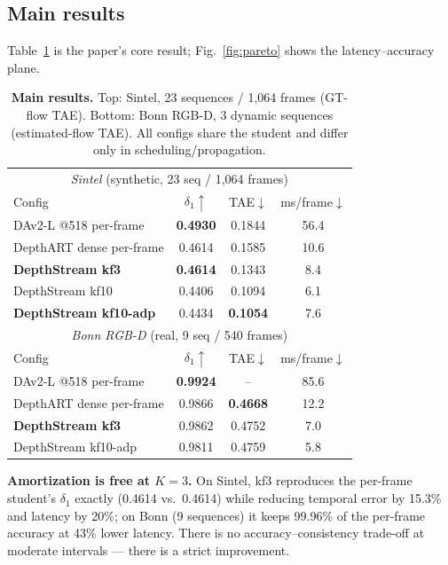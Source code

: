 \documentclass[10pt,twocolumn]{article}
\begin{document}
\subsection{Main results}
Table~\ref{tab:main} is the paper's core result; Fig.~\ref{fig:pareto} shows
the latency--accuracy plane.

\begin{table}[t]
\centering\small
\setlength{\tabcolsep}{3.4pt}
\caption{\textbf{Main results.} Top: Sintel, 23 sequences / 1{,}064 frames
(GT-flow TAE). Bottom: Bonn RGB-D, 3 dynamic sequences (estimated-flow TAE).
All configs share the student and differ only in scheduling/propagation.}
\label{tab:main}
\begin{tabular}{lccc}
\toprule
\multicolumn{4}{c}{\emph{Sintel} (synthetic, 23 seq / 1{,}064 frames)}\\
Config & $\delta_1{\uparrow}$ & TAE$\downarrow$ & ms/frame$\downarrow$\\
\midrule
DAv2-L @518 per-frame & \textbf{0.4930} & 0.1844 & 56.4\\
DepthART dense per-frame & 0.4614 & 0.1585 & 10.6\\
\textbf{DepthStream kf3} & \textbf{0.4614} & 0.1343 & 8.4\\
DepthStream kf10 & 0.4406 & 0.1094 & 6.1\\
\textbf{DepthStream kf10-adp} & 0.4434 & \textbf{0.1054} & 7.6\\
\midrule
\multicolumn{4}{c}{\emph{Bonn RGB-D} (real, 9 seq / 540 frames)}\\
Config & $\delta_1{\uparrow}$ & TAE$\downarrow$ & ms/frame$\downarrow$\\
\midrule
DAv2-L @518 per-frame & \textbf{0.9924} & -- & 85.6\\
DepthART dense per-frame & 0.9866 & \textbf{0.4668} & 12.2\\
\textbf{DepthStream kf3} & 0.9862 & 0.4752 & 7.0\\
DepthStream kf10-adp & 0.9811 & 0.4759 & 5.8\\
\bottomrule
\end{tabular}
\end{table}

\textbf{Amortization is free at $K{=}3$.} On Sintel, kf3 reproduces the
per-frame student's $\delta_1$ exactly (0.4614 vs.\ 0.4614) while reducing
temporal error by 15.3\% and latency by 20\%; on Bonn (9 sequences) it keeps
99.96\% of the per-frame accuracy at 43\% lower latency. There is no
accuracy--consistency
trade-off at moderate intervals --- there is a strict improvement.
\end{document}
